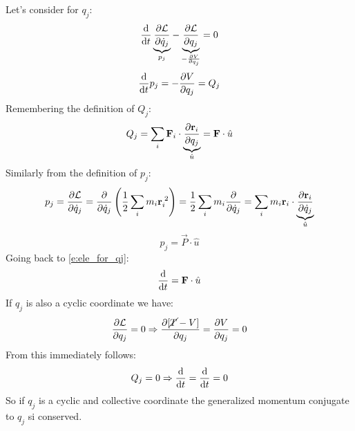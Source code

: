 Let's consider \eleref\;for $q_j$:
\begin{equation}
    \dv{}{t}\underbrace{\pdv{\lagr}{\dot{q}_j}}_{p_j} - \underbrace{\pdv{\lagr}{q_j}}_{-\frac{\partial V}{\partial q_j}} = 0
\end{equation}
\begin{equation} \label{e:ele_for_qj}
    \dv{}{t}p_j = -\pdv{V}{q_j} = Q_j
\end{equation}
Remembering the definition of $Q_j$:
\begin{equation}
    Q_j = \bigsum_i \vec{F}_i \cdot \underbrace{\pdv{\vec{r}_i}{q_j}}_{\hat{u}} = \vec{F}\cdot \hat{u}
\end{equation}
Similarly from the definition of $p_j$:
\begin{equation}
    p_j = \pdv{\lagr}{\dot{q}_j} = \pdv{}{\dot{q}_j}\brackets{\dfrac{1}{2}\bigsum_i m_i \vec{r}_i^{\;2}} = \dfrac{1}{2}\bigsum_i m_i \pdv{}{\dot{q}_j}(\vec{r}_i^2) = \bigsum_i m_i \vec{r}_i \cdot \underbrace{\pdv{\vec{r}_i}{\dot{q}_j}}_{\hat{u}}
\end{equation}
\begin{equation}
    p_j = \vec{P}\cdot\hat{u}
\end{equation}
Going back to \eqref{e:ele_for_qj}:
\begin{equation}
    \dv{}{t}(\vec{P}\cdot\hat{u}) = \vec{F}\cdot \hat{u}
\end{equation}
If $q_j$ is also a cyclic coordinate we have:
\begin{equation}
    \pdv{\lagr}{q_j} = 0 \Rightarrow \pdv{[\cancel{T}-V]}{q_j} = \pdv{V}{q_j} = 0
\end{equation}
From this immediately follows:
\begin{equation}
    Q_j = 0 \Rightarrow \dv{}{t}(p_j) = \dv{}{t}(\vec{P}\cdot\hat{u}) = 0
\end{equation}
So if $q_j$ is a cyclic and collective coordinate the generalized momentum conjugate to $q_j$ si conserved.
